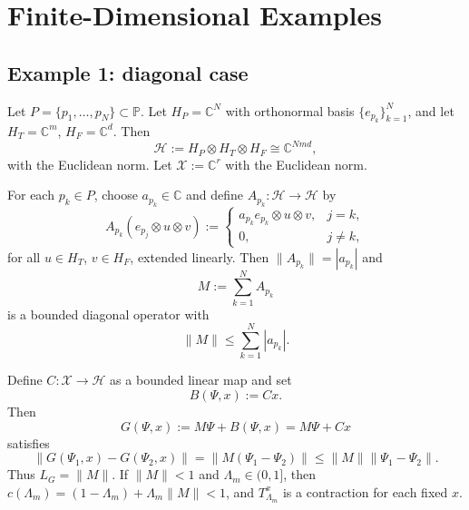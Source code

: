 \documentclass[11pt]{article}
\begin{document}
\section{Finite-Dimensional Examples}

\subsection{Example 1: diagonal case}

Let $P = \{p_1,\dots,p_N\} \subset \mathbb{P}$. Let $H_P = \mathbb{C}^N$ with orthonormal basis $\{e_{p_k}\}_{k=1}^N$, and let $H_T = \mathbb{C}^m$, $H_F = \mathbb{C}^d$. Then
\begin{equation}
  \mathcal{H} := H_P \otimes H_T \otimes H_F
  \cong \mathbb{C}^{Nmd},
\end{equation}
with the Euclidean norm. Let $\mathcal{X} := \mathbb{C}^r$ with the Euclidean norm.

For each $p_k \in P$, choose $a_{p_k} \in \mathbb{C}$ and define $A_{p_k} : \mathcal{H} \to \mathcal{H}$ by
\begin{equation}
  A_{p_k}(e_{p_j} \otimes u \otimes v)
  :=
  \begin{cases}
    a_{p_k} e_{p_k} \otimes u \otimes v, & j = k, \\
    0, & j \neq k,
  \end{cases}
\end{equation}
for all $u \in H_T$, $v \in H_F$, extended linearly. Then $\|A_{p_k}\| = |a_{p_k}|$ and
\begin{equation}
  M := \sum_{k=1}^N A_{p_k}
\end{equation}
is a bounded diagonal operator with
\begin{equation}
  \|M\| \leq \sum_{k=1}^N |a_{p_k}|.
\end{equation}

Define $C : \mathcal{X} \to \mathcal{H}$ as a bounded linear map and set
\begin{equation}
  B(\Psi,x) := Cx.
\end{equation}
Then
\begin{equation}
  G(\Psi,x) := M\Psi + B(\Psi,x) = M\Psi + Cx
\end{equation}
satisfies
\begin{equation}
  \|G(\Psi_1,x) - G(\Psi_2,x)\|
  =
  \|M(\Psi_1 - \Psi_2)\|
  \leq
  \|M\| \|\Psi_1 - \Psi_2\|.
\end{equation}
Thus $L_G = \|M\|$. If $\|M\| < 1$ and $\Lambda_m \in (0,1]$, then $c(\Lambda_m) = (1 - \Lambda_m) + \Lambda_m \|M\| < 1$, and $T_{\Lambda_m}^x$ is a contraction for each fixed $x$.
\end{document}
